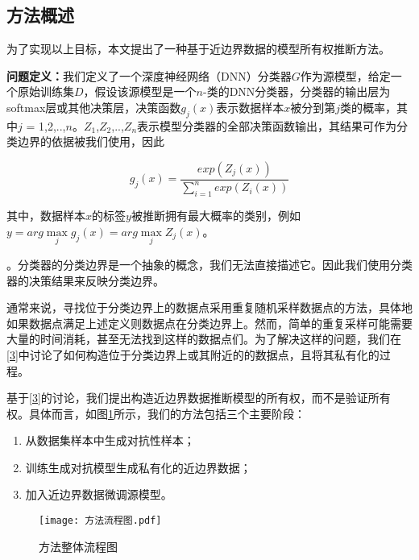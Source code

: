 \subsection{方法概述}

为了实现以上目标，本文提出了一种基于近边界数据的模型所有权推断方法。

\noindent\textbf{问题定义：}我们定义了一个深度神经网络（DNN）分类器$G$作为源模型，给定一个原始训练集$D$，假设该源模型是一个$n$-类的DNN分类器，分类器的输出层为softmax层或其他决策层，决策函数$g_j(x)$表示数据样本$x$被分到第$j$类的概率，其中$j$ = 1,2,..,$n$。$Z_1$,$Z_2$,..,$Z_n$表示模型分类器的全部决策函数输出，其结果可作为分类边界的依据被我们使用，因此

\begin{equation}
	g_j(x) = \frac{exp(Z_j(x))}{\sum_{i = 1}^n exp(Z_i(x))}
\end{equation}

\noindent 其中，数据样本$x$的标签$y$被推断拥有最大概率的类别，例如$y = arg \mathop{max} \limits_j g_j(x) = arg \mathop{max} \limits_j Z_j(x)$。

\begin{myDef}
	\label{def:2}
	。分类器的分类边界是一个抽象的概念，我们无法直接描述它。因此我们使用分类器的决策结果来反映分类边界。
\end{myDef}

通常来说，寻找位于分类边界上的数据点采用重复随机采样数据点的方法，具体地如果数据点满足上述定义则数据点在分类边界上。然而，简单的重复采样可能需要大量的时间消耗，甚至无法找到这样的数据点们。为了解决这样的问题，我们在\ref{3}中讨论了如何构造位于分类边界上或其附近的的数据点，且将其私有化的过程。

基于\ref{3}的讨论，我们提出构造近边界数据推断模型的所有权，而不是验证所有权。具体而言，如图\ref{方法流程图}所示，我们的方法包括三个主要阶段：
\begin{enumerate}
	\renewcommand{\labelenumi}{\theenumi)}
	\item 从数据集样本中生成对抗性样本；
	\item 训练生成对抗模型生成私有化的近边界数据；
	\item 加入近边界数据微调源模型。
\end{enumerate}

\begin{figure}[htbp]%
	\centering
	\texttt{[image: 方法流程图.pdf]}
	\setlength{\abovecaptionskip}{5mm} %
	\caption{方法整体流程图}
	\label{方法流程图}
\end {figure}

